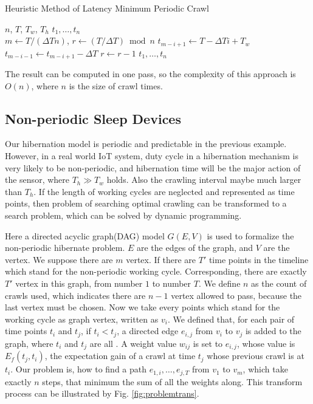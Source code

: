 \documentclass[conference]{IEEEtran}
\begin{document}
\begin{algorithm}
\caption{Heuristic Method of Latency Minimum Periodic Crawl}
  \begin{algorithmic}[1]
  \renewcommand{\algorithmicrequire}{\textbf{Input:}}
  \renewcommand{\algorithmicensure}{\textbf{Output:}}
  \REQUIRE $n$, $T$, $T_w$, $T_h$
  \ENSURE  $t_1,\ldots,t_n$
  \\ 
  \STATE $m \gets T/(\Delta T n)$, $r\gets (T/\Delta T)\bmod{n}$
    \STATE $t_{m-i+1}\gets T-\Delta T i + T_w$
    	\STATE $t_{m-i-1}\gets t_{m-i+1}-\Delta T$
        \STATE $r\gets r-1$
    \ENDIF
  \ENDFOR
  \RETURN $t_1,\ldots,t_n$
  \end{algorithmic} 
\end{algorithm}

The result can be computed in one pass, so the complexity of this approach is $O(n)$, where $n$ is the size of crawl times.

\subsection{Non-periodic Sleep Devices}
Our hibernation model is periodic and predictable in the previous example. However, in a real world IoT system, duty cycle in a hibernation mechanism is very likely to be non-periodic, and hibernation time will be the major action of the sensor, where $T_h\gg T_w$ holds. Also the crawling interval maybe much larger than $T_h$. 
If the length of working cycles are neglected and represented as time points, then problem of searching optimal crawling can be transformed to a search problem, which can be solved by dynamic programming.


Here a directed acyclic graph(DAG) model $G(E,V)$ is used to formalize the non-periodic hibernate problem.
$E$ are the edges of the graph, and $V$ are the vertex. We suppose there are $m$ vertex. 
If there are $T'$ time points in the timeline which stand for the non-periodic working cycle. Corresponding, there are exactly $T'$ vertex in this graph, from number $1$ to number $T$. 
We define $n$ as the count of crawls used, which indicates there are $n-1$ vertex allowed to pass, because the last vertex must be chosen. 
Now we take every points which stand for the working cycle as graph vertex, written as $v_i$. We defined that, for each pair of time points $t_i$ and $t_j$, if $t_i<t_j$, a directed edge $e_{i,j}$ from $v_i$ to $v_j$ is added to the graph, where $t_i$ and $t_j$ are all . A weight value $w_{ij}$ is set to $e_{i,j}$, whose value is $E_f(t_j, t_i)$, the expectation gain of a crawl at time $t_j$ whose previous crawl is at $t_i$.
Our problem is, how to find a path $e_{1,i},\ldots,e_{j,T}$ from $v_1$ to $v_m$, which take exactly $n$ steps, that minimum the sum of all the weights along. This transform process can be illustrated by Fig. \ref{fig:problemtrans}.
\end{document}
